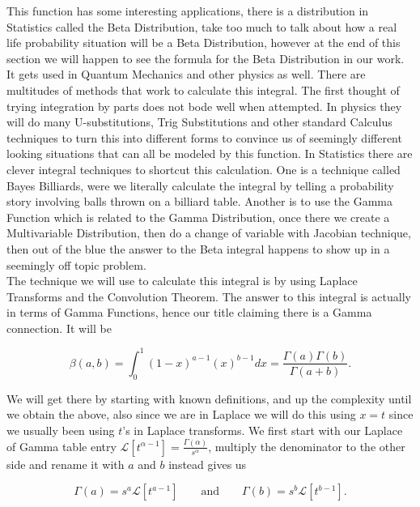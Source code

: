 \documentclass[12pt]{article}
\newcommand{\lp}{\mathscr{L}}
\begin{document}
This function has some interesting applications, there is a distribution in Statistics called the Beta Distribution, take too much to talk about how a real life probability situation will be a Beta Distribution, however at the end of this section we will happen to see the formula for the Beta Distribution in our work. It gets used in Quantum Mechanics and other physics as well. There are multitudes of methods that work to calculate this integral. The first thought of trying integration by parts does not bode well when attempted. In physics they will do many U-substitutions, Trig Substitutions and other standard  Calculus techniques to turn this into different forms to convince us of seemingly different looking situations that can all be modeled by this function. In Statistics there are clever integral techniques to shortcut this calculation. One is a technique called Bayes Billiards, were we literally calculate the integral by telling a probability story involving balls thrown on a billiard table. Another is to use the Gamma Function which is related to the Gamma Distribution, once there we create a Multivariable Distribution, then do a change of variable with Jacobian technique, then out of the blue the answer to the Beta integral happens to show up in a seemingly off topic problem. \\

The technique we will use to calculate this integral is by using Laplace Transforms and the Convolution Theorem. The answer to this integral is actually in terms of Gamma Functions, hence our title claiming there is a Gamma connection. It will be

\begin{equation*}
    \beta(a,b) = \int_{0}^{1} (1-x)^{a-1}(x)^{b-1} dx = \frac{\Gamma(a)\Gamma(b)}{\Gamma(a+b)}.
\end{equation*}

We will get there by starting with known definitions, and up the complexity until we obtain the above, also since we are in Laplace we will do this using $x=t$ since we usually been using $t$'s in Laplace transforms. We first start with our Laplace of Gamma table entry $\lp[t^{\alpha-1}]=\frac{\Gamma(\alpha)}{s^{\alpha}}$, multiply the denominator to the other side and rename it with $a$ and $b$ instead gives us

\begin{equation*}
    \Gamma(a)=s^a\lp[t^{a-1}] \qquad \text{and} \qquad \Gamma(b)=s^b\lp[t^{b-1}].
\end{equation*}
\end{document}
